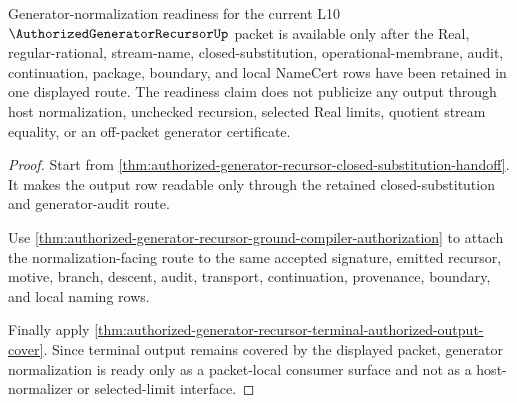 \begin{theorem}
\label{thm:authorized-generator-recursor-generator-normalization-readiness}
Generator-normalization readiness for the current L10 $\AuthorizedGeneratorRecursorUp$ packet is available only after the Real, regular-rational, stream-name, closed-substitution, operational-membrane, audit, continuation, package, boundary, and local NameCert rows have been retained in one displayed route. The readiness claim does not publicize any output through host normalization, unchecked recursion, selected Real limits, quotient stream equality, or an off-packet generator certificate.
\end{theorem}
\begin{proof}
Start from \autoref{thm:authorized-generator-recursor-closed-substitution-handoff}. It makes the output row readable only through the retained closed-substitution and generator-audit route.

Use \autoref{thm:authorized-generator-recursor-ground-compiler-authorization} to attach the normalization-facing route to the same accepted signature, emitted recursor, motive, branch, descent, audit, transport, continuation, provenance, boundary, and local naming rows.

Finally apply \autoref{thm:authorized-generator-recursor-terminal-authorized-output-cover}. Since terminal output remains covered by the displayed packet, generator normalization is ready only as a packet-local consumer surface and not as a host-normalizer or selected-limit interface.
\end{proof}

